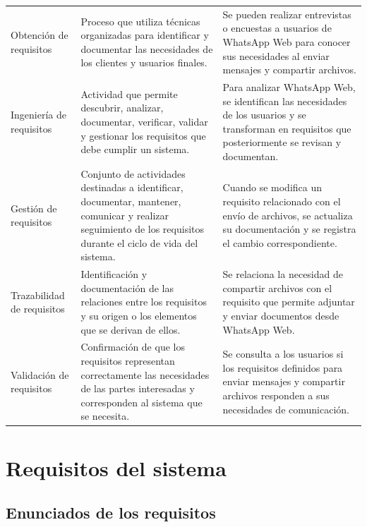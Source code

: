 \documentclass[12pt,a4paper,oneside]{article}
\begin{document}
\begin{longtable}{L{3.0cm} L{5.2cm} L{5.2cm}}
Obtención de requisitos &
Proceso que utiliza técnicas organizadas para identificar y documentar las necesidades de los clientes y usuarios finales. &
Se pueden realizar entrevistas o encuestas a usuarios de WhatsApp Web para conocer sus necesidades al enviar mensajes y compartir archivos. \\

Ingeniería de requisitos &
Actividad que permite descubrir, analizar, documentar, verificar, validar y gestionar los requisitos que debe cumplir un sistema. &
Para analizar WhatsApp Web, se identifican las necesidades de los usuarios y se transforman en requisitos que posteriormente se revisan y documentan. \\

Gestión de requisitos &
Conjunto de actividades destinadas a identificar, documentar, mantener, comunicar y realizar seguimiento de los requisitos durante el ciclo de vida del sistema. &
Cuando se modifica un requisito relacionado con el envío de archivos, se actualiza su documentación y se registra el cambio correspondiente. \\

Trazabilidad de requisitos &
Identificación y documentación de las relaciones entre los requisitos y su origen o los elementos que se derivan de ellos. &
Se relaciona la necesidad de compartir archivos con el requisito que permite adjuntar y enviar documentos desde WhatsApp Web. \\

Validación de requisitos &
Confirmación de que los requisitos representan correctamente las necesidades de las partes interesadas y corresponden al sistema que se necesita. &
Se consulta a los usuarios si los requisitos definidos para enviar mensajes y compartir archivos responden a sus necesidades de comunicación. \\

\end{longtable}
\normalsize


\section{Requisitos del sistema}

\subsection{Enunciados de los requisitos}
\end{document}
